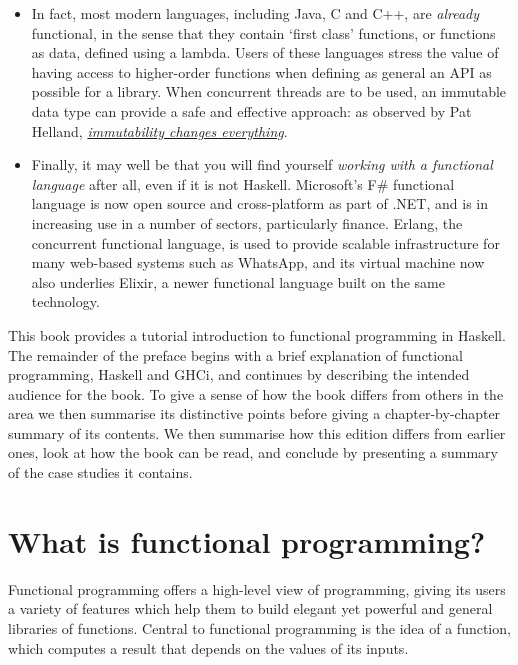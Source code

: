 \begin{itemize}
\item
In fact, most modern languages, including Java, C and C++, are \emph{already} functional, in the sense that they contain `first class' functions, or functions as data, defined using a lambda. Users of these languages stress the value of having access to higher-order functions when defining as general an API as possible for a library. When concurrent threads are to be used, an immutable data type can provide a safe and effective approach: as observed by Pat Helland, \href{https://queue.acm.org/doi/10.1145/2857274.2884038}{\emph{immutability changes everything}}.
\item
Finally, it may well be that you will find yourself \emph{working with a functional language} after all, even if it is not Haskell. Microsoft's F\# functional language is now open source and cross-platform as part of .NET, and is in increasing use in a number of sectors, particularly finance. Erlang, the concurrent functional language, is used to provide scalable infrastructure for many web-based systems such as WhatsApp, and its virtual machine now also underlies Elixir, a newer functional language built on the same technology. 
\end{itemize}
This book provides a tutorial introduction to functional programming
in Haskell. The remainder of the preface begins with a brief explanation of
functional programming, Haskell and GHCi, and continues by describing the intended audience for the book. To give a sense of how the book differs from others in the area we then summarise its distinctive points before giving a chapter-by-chapter summary of its contents. We then summarise how this edition differs from earlier ones, look at how the book can be read, and conclude by presenting a summary of the case studies it contains.

\begin{webvideos}
\end{webvideos}

\section*{What is functional programming?}

Functional programming offers a high-level view of programming, giving
its users a variety of features which help them to build elegant yet
powerful and general libraries of functions. Central to functional
programming is the idea of a function, which computes
a result that depends on the values of its inputs.

